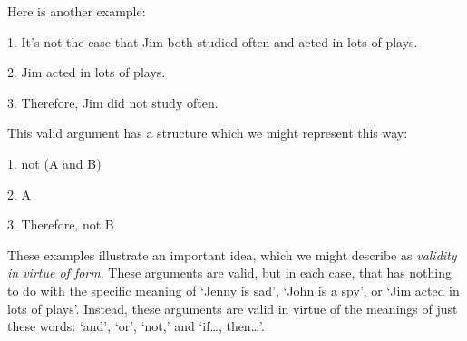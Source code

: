 Here is another example:
	\begin{earg}
		\item[1.] It's not the case that Jim both studied often and acted in lots of plays.
		\item[2.] Jim acted in lots of plays.
		\item[3.] Therefore, Jim did not study often.
	\end{earg}
This valid argument has a structure which we might represent this way:
	\begin{earg}
		\item[1.] not (A and B)
		\item[2.] A
		\item[3.] Therefore, not B
	\end{earg}
These examples illustrate an important idea, which we might describe as \emph{validity in virtue of form}. These arguments are valid, but in each case, that has nothing to do with the specific meaning of `Jenny is sad', `John is a spy', or `Jim acted in lots of plays'. Instead, these arguments are valid in virtue of the meanings of just these words: `and', `or', `not,' and `if\ldots, then\ldots'. 


